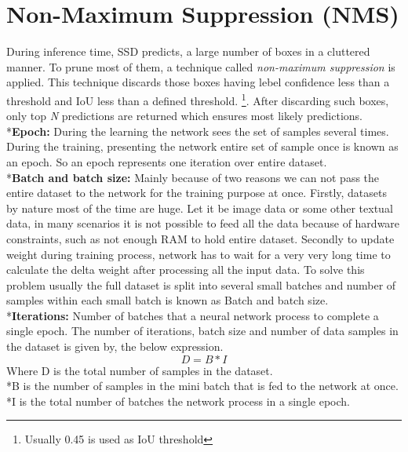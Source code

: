 \section{Non-Maximum Suppression (NMS)}
During inference time, SSD predicts, a large number of boxes in a cluttered manner. To prune most of them, a technique called \textit{non-maximum suppression} is applied. This technique discards those boxes having lebel confidence less than a threshold and IoU less than a defined threshold. \footnote{Usually 0.45 is used as IoU threshold}. After discarding such boxes, only top \textit{N} predictions are returned which ensures most likely predictions.
\\*\textbf{Epoch:}
During the learning the network sees the set of samples several times. During the training, presenting the network entire set of sample once is known as an epoch. So an epoch represents one iteration over entire dataset.
\\*\textbf{Batch and batch size:}
Mainly because of two reasons we can not pass the entire dataset to the network for the training purpose at once. Firstly, datasets by nature most of the time are huge. Let it be image data or some other textual data, in many scenarios it is not possible to feed all the data because of hardware constraints, such as not enough RAM to hold entire dataset.
Secondly to update weight during training process, network has to wait for a very very long time to calculate the delta weight after processing all the input data. To solve this problem usually the full dataset is split into several small batches and number of samples within each small batch is known as 
Batch and batch size.
\\*\textbf{Iterations:} 
Number of batches that a neural network process to complete a single epoch.
The number of  iterations, batch size and  number of data samples in the dataset is given by, the below expression.
\begin{equation}
    D = B * I
\end{equation}
Where D is the total number of samples in the dataset.
\\*B is the number of samples in the mini batch that is fed to the network at once.
\\*I is the  total number of batches the network process in a single epoch.

